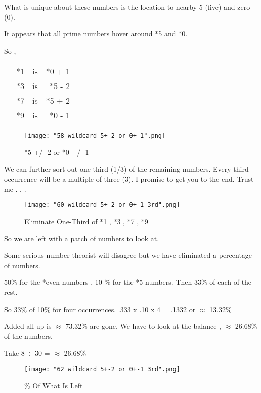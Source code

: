 \documentclass[12pt,letterpaper,oneside,titlepage]{article}
\begin{document}
\par 
What is unique about these numbers is the location to nearby 5 (five) and zero (0).
\\
\par 
It appears that all prime numbers hover around *5 and *0.
\\
\par 
So , 
\\
\par
\begin{tabular}{rrrr}
	\rule[-1ex]{0pt}{2.5ex}  \hspace{1cm}&*1&is&*0 + 1\\ 
	\rule[-1ex]{0pt}{2.5ex}  \hspace{1cm}&*3&is& *5 - 2\\ 
	\rule[-1ex]{0pt}{2.5ex}  \hspace{1cm}&*7&is&*5 + 2\\ 
	\rule[-1ex]{0pt}{2.5ex}  \hspace{1cm}&*9&is& *0 - 1\\ 
\end{tabular} 
\begin{figure}[h]
\centering
\texttt{[image: "58 wildcard 5+-2 or 0+-1".png]}
\caption{*5 +/- 2 or *0 +/- 1}
\end{figure}
\pagebreak

\par
We can further sort out one-third (1/3) of the remaining numbers. Every third occurrence will be a multiple of three (3).
I promise to get you to the end. Trust me  . . .
\\
\begin{figure}[h]
\centering
\texttt{[image: "60 wildcard 5+-2 or 0+-1 3rd".png]}
\caption{Eliminate One-Third of *1 , *3 , *7 , *9}
\end{figure}
\pagebreak


\par 
So we are left with a patch of numbers to look at.
\\
\par
 Some serious number theorist will disagree but we have eliminated a percentage of numbers. 
\\
\par 50\% for the *even numbers , 10 \% for the *5 numbers. Then 33\% of each of the rest. 
\\
\par 
So 33\% of 10\% for four occurrences. .333 x .10 x 4 = .1332 or $\approx$ 13.32\%
\\
\par 
Added all up is $\approx$ 73.32\% are gone. We have to look at the balance , $\approx$ 26.68\% of the numbers.
\\	
\par 
Take 8 $\div$ 30 = $\approx$ 26.68\%
\begin{figure}[h]
\centering
\texttt{[image: "62 wildcard 5+-2 or 0+-1 3rd".png]}
\caption{\% Of What Is Left}
\end{figure}
\pagebreak
\end{document}
